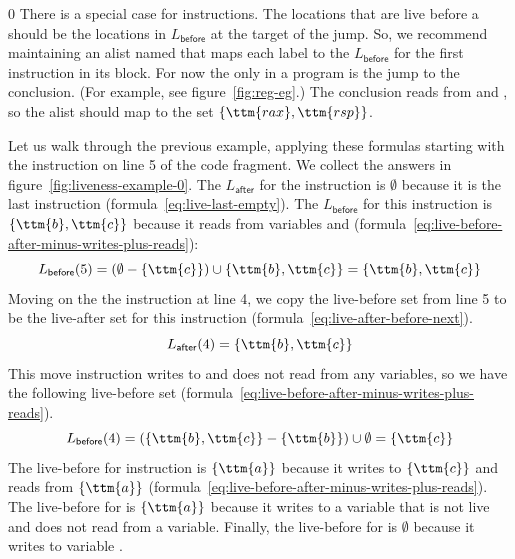 \documentclass[7x10]{TimesAPriori_MIT}%
\def\racketEd{0}
\providecommand{\BookEdition}{1}
\let\edition\BookEdition
\numberwithin{theorem}{chapter}
\numberwithin{definition}{chapter}
\numberwithin{equation}{chapter}
\begin{document}
{\if\edition\racketEd
%
There is a special case for  instructions.  The locations
that are live before a  should be the locations in
$L_{\mathsf{before}}$ at the target of the jump. So, we recommend
maintaining an alist named  that maps each label to
the $L_{\mathsf{before}}$ for the first instruction in its block. For
now the only  in a \LangXVar{} program is the jump to the
conclusion. (For example, see figure~\ref{fig:reg-eg}.)  The
conclusion reads from  and , so the alist should map
 to the set $\{\ttm{rax},\ttm{rsp}\}$.
%
\fi}

Let us walk through the previous example, applying these formulas
starting with the instruction on line 5 of the code fragment. We
collect the answers in figure~\ref{fig:liveness-example-0}.  The
$L_{\mathsf{after}}$ for the  instruction is
$\emptyset$ because it is the last instruction
(formula~\eqref{eq:live-last-empty}).  The $L_{\mathsf{before}}$ for
this instruction is $\{\ttm{b},\ttm{c}\}$ because it reads from
variables  and 
(formula~\eqref{eq:live-before-after-minus-writes-plus-reads}):
\[
   L_{\mathsf{before}}(5) = (\emptyset - \{\ttm{c}\}) \cup \{ \ttm{b}, \ttm{c} \} = \{ \ttm{b}, \ttm{c} \}
\]
Moving on the the instruction  at line 4, we copy
the live-before set from line 5 to be the live-after set for this
instruction (formula~\eqref{eq:live-after-before-next}).
\[
  L_{\mathsf{after}}(4) = \{ \ttm{b}, \ttm{c} \}
\]
This move instruction writes to  and does not read from any
variables, so we have the following live-before set
(formula~\eqref{eq:live-before-after-minus-writes-plus-reads}).
\[
  L_{\mathsf{before}}(4) = (\{\ttm{b},\ttm{c}\} - \{\ttm{b}\}) \cup \emptyset = \{ \ttm{c} \}
\]
The live-before for instruction 
is $\{\ttm{a}\}$ because it writes to $\{\ttm{c}\}$ and reads from $\{\ttm{a}\}$
(formula~\eqref{eq:live-before-after-minus-writes-plus-reads}).  The
live-before for  is $\{\ttm{a}\}$ because it writes to a
variable that is not live and does not read from a variable.
Finally, the live-before for  is $\emptyset$
because it writes to variable .
\end{document}
